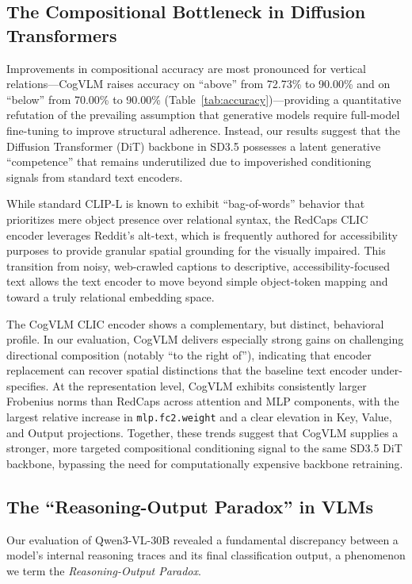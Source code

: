 \subsection{The Compositional Bottleneck in Diffusion Transformers}
Improvements in compositional accuracy are most pronounced for vertical relations---CogVLM raises accuracy on ``above'' from 72.73\% to 90.00\% and on ``below'' from 70.00\% to 90.00\% (Table~\ref{tab:accuracy})---providing a quantitative refutation of the prevailing assumption that generative models require full-model fine-tuning to improve structural adherence. Instead, our results suggest that the Diffusion Transformer (DiT) backbone in SD3.5 possesses a latent generative ``competence'' that remains underutilized due to impoverished conditioning signals from standard text encoders.

While standard CLIP-L is known to exhibit ``bag-of-words'' behavior that prioritizes mere object presence over relational syntax, the RedCaps CLIC encoder leverages Reddit’s alt-text, which is frequently authored for accessibility purposes to provide granular spatial grounding for the visually impaired. This transition from noisy, web-crawled captions to descriptive, accessibility-focused text allows the text encoder to move beyond simple object-token mapping and toward a truly relational embedding space.

The CogVLM CLIC encoder shows a complementary, but distinct, behavioral profile. In our evaluation, CogVLM delivers especially strong gains on challenging directional composition (notably ``to the right of''), indicating that encoder replacement can recover spatial distinctions that the baseline text encoder under-specifies. At the representation level, CogVLM exhibits consistently larger Frobenius norms than RedCaps across attention and MLP components, with the largest relative increase in \texttt{mlp.fc2.weight} and a clear elevation in Key, Value, and Output projections. Together, these trends suggest that CogVLM supplies a stronger, more targeted compositional conditioning signal to the same SD3.5 DiT backbone, bypassing the need for computationally expensive backbone retraining.

\subsection{The ``Reasoning-Output Paradox'' in VLMs}
Our evaluation of Qwen3-VL-30B revealed a fundamental discrepancy between a model's internal reasoning traces and its final classification output, a phenomenon we term the \textit{Reasoning-Output Paradox}.

